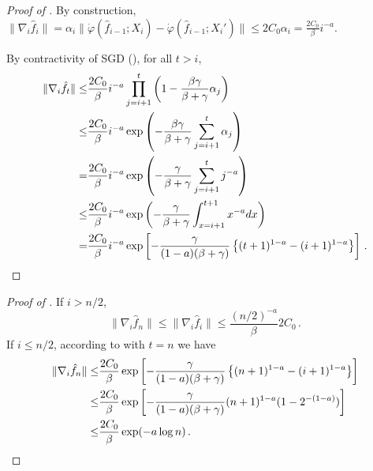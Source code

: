 \documentclass[11pt]{article}
\theoremstyle{plain}
\begin{document}
\begin{proof}
    [Proof of ]
    By construction,
$\|\nabla_i\hat f_i\|= \alpha_i\|\dot\varphi(\hat f_{i-1};X_i)-\dot\varphi(\hat f_{i-1};X_i')\|\le 2C_0\alpha_i = \frac{2C_0}{\beta}i^{-a}$.

By contractivity of SGD (), for all $t > i$,
\begin{align*}
    \|\nabla_i\hat f_t\|\le & \frac{2C_0}{\beta}i^{-a}\prod_{j=i+1}^t\left(1-\frac{\beta\gamma}{\beta+\gamma}\alpha_j\right)\\
    \le &\frac{2C_0}{\beta}i^{-a} \exp\left(-\frac{\beta\gamma}{\beta+\gamma}\sum_{j=i+1}^t \alpha_j\right)\\
    = &\frac{2C_0}{\beta}i^{-a} \exp\left(-\frac{\gamma}{\beta+\gamma}\sum_{j=i+1}^t j^{-a}\right)\\
    \le &\frac{2C_0}{\beta}i^{-a} \exp\left(-\frac{\gamma}{\beta+\gamma}\int_{x=i+1}^{t+1} x^{-a}dx\right)\\
    = & \frac{2C_0}{\beta}i^{-a}\exp\left[-\frac{\gamma}{(1-a)(\beta+\gamma)}\left\{(t+1)^{1-a}-(i+1)^{1-a}\right\}\right]\,.\qedhere
\end{align*}

\end{proof}
    \begin{proof}[Proof of ]
    If $i>n/2$, $$\|\nabla_i \hat f_n\|\le \|\nabla_i\hat f_{i}\|\le \frac{(n/2)^{-a}}{\beta}2C_0\,.$$
    If $i\le n/2$, according to  with $t=n$ we have
    \begin{align*}
    \|\nabla_i\hat f_n\|\le & \frac{2C_0}{\beta}\exp\left[-\frac{\gamma}{(1-a)(\beta+\gamma)}\left\{(n+1)^{1-a}-(i+1)^{1-a}\right\}\right]\\
    \le &\frac{2C_0}{\beta}\exp\left[-\frac{\gamma}{(1-a)(\beta+\gamma)}(n+1)^{1-a}(1-2^{-(1-a)})\right]\\
    \le & \frac{2C_0}{\beta}\exp(-a\log n)\,.
    \qedhere
    \end{align*}
\end{proof}
\end{document}
